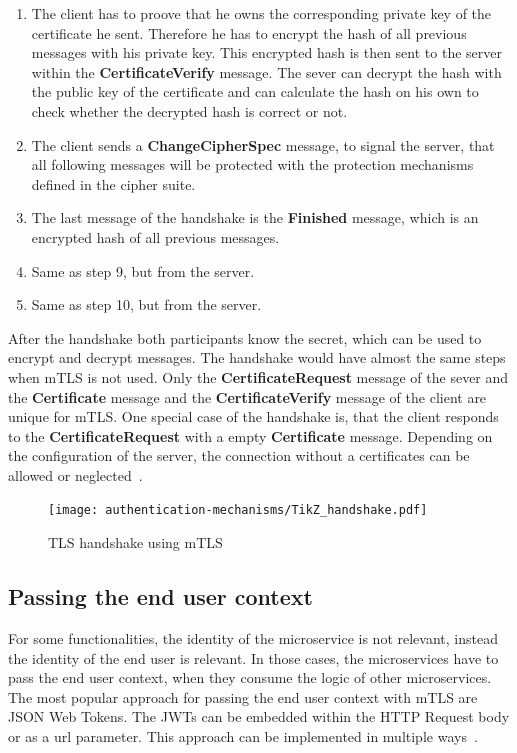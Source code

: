 \begin{enumerate}
	\item The client has to proove that he owns the corresponding private key of the certificate he sent.
		Therefore he has to encrypt the hash of all previous messages with his private key.
		This encrypted hash is then sent to the server within the \textbf{CertificateVerify} message.
		The sever can decrypt the hash with the public key of the certificate and can calculate the hash on his own to check whether the decrypted hash is correct or not.
	\item The client sends a \textbf{ChangeCipherSpec} message, to signal the server, that all following messages will be protected with the protection mechanisms defined in the cipher suite.
	\item The last message of the handshake is the \textbf{Finished} message, which is an encrypted hash of all previous messages.
	\item Same as step 9, but from the server.
	\item Same as step 10, but from the server.
\end{enumerate}
After the handshake both participants know the secret, which can be used to encrypt and decrypt messages.
The handshake would have almost the same steps when mTLS is not used.
Only the \textbf{CertificateRequest} message of the sever and the \textbf{Certificate} message and the \textbf{CertificateVerify} message of the client are unique for mTLS.
One special case of the handshake is, that the client responds to the \textbf{CertificateRequest} with a empty \textbf{Certificate} message.
Depending on the configuration of the server, the connection without a certificates can be allowed or neglected~\cite{parsovs2013practical}.

\begin{figure}
    \centering
	\texttt{[image: authentication-mechanisms/TikZ\_handshake.pdf]}
    \caption{TLS handshake using mTLS~\cite{parsovs2013practical}}
	\label{fig:tlshandshake}
\end{figure}

\subsection{Passing the end user context} \label{sec:mtls_end_user_context}
For some functionalities, the identity of the microservice is not relevant, instead the identity of the end user is relevant.
In those cases, the microservices have to pass the end user context, when they consume the logic of other microservices.
The most popular approach for passing the end user context with mTLS are JSON Web Tokens.
The JWTs can be embedded within the HTTP Request body or as a url parameter.
This approach can be implemented in multiple ways~\cite{dias2020microservices}.

